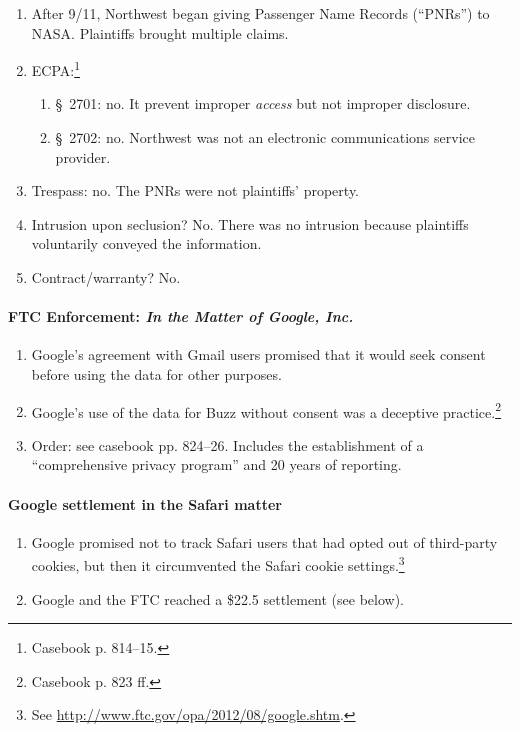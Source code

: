 \begin{enumerate}
    \item After 9/11, Northwest began giving Passenger Name Records (``PNRs'') 
    to NASA. Plaintiffs brought multiple claims.
    \item ECPA:\footnote{Casebook p. 814--15.}
    \begin{enumerate}
        \item \S\ 2701: no. It prevent improper \emph{access} but not improper 
        disclosure.
        \item \S\ 2702: no. Northwest was not an electronic communications 
        service provider.
    \end{enumerate}
    \item Trespass: no. The PNRs were not plaintiffs' property.
    \item Intrusion upon seclusion? No. There was no intrusion because 
    plaintiffs voluntarily conveyed the information.
    \item Contract/warranty? No.
\end{enumerate}

\paragraph{FTC Enforcement: \emph{In the Matter of Google, Inc.}}

\begin{enumerate}
    \item Google's agreement with Gmail users promised that it would seek 
    consent before using the data for other purposes.
    \item Google's use of the data for Buzz without consent was a deceptive 
    practice.\footnote{Casebook p. 823 ff.}
    \item Order: see casebook pp. 824--26. Includes the establishment of a 
    ``comprehensive privacy program'' and 20 years of reporting.
\end{enumerate}

\paragraph{Google settlement in the Safari matter}

\begin{enumerate}
    \item Google promised not to track Safari users that had opted out of 
    third-party cookies, but then it circumvented the Safari cookie 
    settings.\footnote{See \url{http://www.ftc.gov/opa/2012/08/google.shtm}.}
    \item Google and the FTC reached a \$22.5 settlement (see below).
\end{enumerate}

